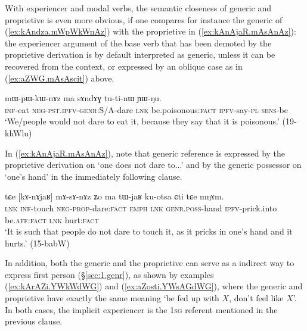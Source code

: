 With experiencer and modal verbs, the semantic closeness of generic and proprietive is even more obvious, if one compares for instance the generic of  (\ref{ex:kAndza.mWpWkWnAz}) with the proprietive    in (\ref{ex:kAnAjaR.mAsAnAz}): the experiencer argument of the base verb that has been demoted by the proprietive derivation is by default interpreted as generic, unless it can be recovered from the context, or expressed by an oblique case as in (\ref{ex:aZWG.mAsAscit}) above.

\begin{exe}
\ex \label{ex:kAndza.mWpWkWnAz}
\gll [kɤ-ndza] mɯ-pɯ-kɯ-nɤz ma sɤndɤɣ tu-ti-nɯ ɲɯ-ŋu. \\
\textsc{inf}-eat \textsc{neg}-\textsc{pst}.\textsc{ipfv}-\textsc{genr}:S/A-dare \textsc{lnk} be.poisonous:\textsc{fact} \textsc{ipfv}-say-\textsc{pl} \textsc{sens}-be \\
\glt `We/people would not dare to eat it, because they say that it is poisonous.' (19-khWlu)
\end{exe}

In (\ref{ex:kAnAjaR.mAsAnAz}), note that generic reference is expressed by the proprietive derivation on  `one does not dare to...' and by the generic possessor on  `one's hand' in the immediately following clause.

\begin{exe}
\ex \label{ex:kAnAjaR.mAsAnAz}
\gll tɕe [kɤ-nɤjaʁ] mɤ-sɤ-nɤz ʑo ma tɯ-jaʁ ku-otsa ɕti tɕe mŋɤm. \\
\textsc{lnk} \textsc{inf}-touch \textsc{neg}-\textsc{prop}-dare:\textsc{fact} \textsc{emph} \textsc{lnk} \textsc{genr}.\textsc{poss}-hand \textsc{ipfv}-prick.into be.\textsc{aff}:\textsc{fact} \textsc{lnk} hurt:\textsc{fact} \\
\glt `It is such that people do not dare to touch it, as it pricks in one's hand and it hurts.' (15-babW)
\end{exe}

 In addition, both the generic and the proprietive can serve as a indirect way to express first person (§\ref{sec:1.genr}), as shown by examples (\ref{ex:kArAZi.YWkWdWG}) and (\ref{ex:aZosti.YWsAGdWG}), where the generic  and proprietive  have exactly the same meaning `be fed up with $X$, don't feel like $X$'. In both cases, the implicit experiencer is the \textsc{1sg} referent mentioned in the previous clause.


